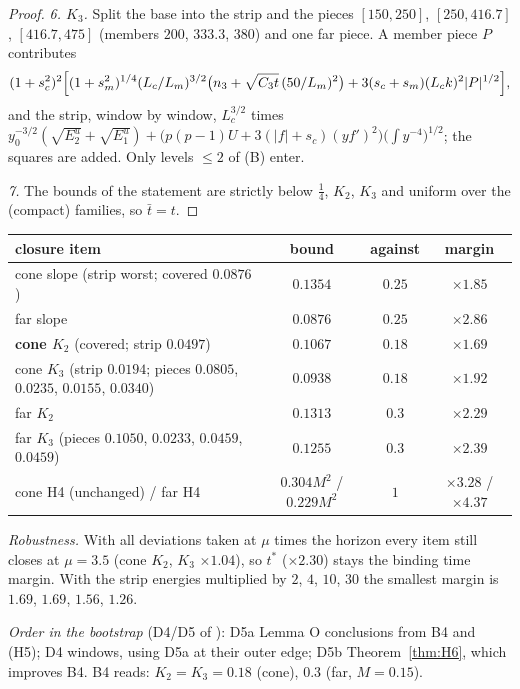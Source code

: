 \documentclass[11pt]{article}
\newcommand{\fn}[1]{\texttt{\detokenize{#1}}}
\begin{document}
\begin{proof}
\emph{6. $K_3$.} Split the base into the strip and the pieces $[150,250]$, $[250,416.7]$, $[416.7,475]$ (members $200$, $333.3$, $380$) and one far piece. A member piece $P$ contributes
\[(1+s_c^2)^2\Bigl[(1+s_m^2)^{1/4}(L_c/L_m)^{3/2}\bigl(n_3+\sqrt{C_3t}\,(50/L_m)^2\bigr)+3(s_c+s_m)(L_ck)^2|P|^{1/2}\Bigr],\]
and the strip, window by window, $L_c^{3/2}$ times $y_0^{-3/2}(\sqrt{E^u_2}+\sqrt{E^u_1})+\bigl(p(p-1)U+3(|f|+s_c)(yf')^2\bigr)\bigl(\int y^{-4}\bigr)^{1/2}$; the squares are added. Only levels $\le2$ of (B) enter.

\emph{7.} The bounds of the statement are strictly below $\tfrac14$, $K_2$, $K_3$ and uniform over the (compact) families, so $\bar t=t$.
\end{proof}
\begin{center}\small\begin{tabular}{lccc}\toprule
closure item & bound & against & margin\\\midrule
cone slope (strip worst; covered $0.0876$) & $0.1354$ & $0.25$ & $\times1.85$\\
far slope & $0.0876$ & $0.25$ & $\times2.86$\\
\textbf{cone $K_2$} (covered; strip $0.0497$) & $0.1067$ & $0.18$ & $\mathbf{\times1.69}$\\
cone $K_3$ (strip $0.0194$; pieces $0.0805$, $0.0235$, $0.0155$, $0.0340$) & $0.0938$ & $0.18$ & $\times1.92$\\
far $K_2$ & $0.1313$ & $0.3$ & $\times2.29$\\
far $K_3$ (pieces $0.1050$, $0.0233$, $0.0459$, $0.0459$) & $0.1255$ & $0.3$ & $\times2.39$\\
cone H4 (unchanged) / far H4 & $0.304M^2$ / $0.229M^2$ & $1$ & $\times3.28$ / $\times4.37$\\\bottomrule
\end{tabular}\end{center}
\emph{Robustness.} With all deviations taken at $\mu$ times the horizon every item still closes at $\mu=3.5$ (cone $K_2$, $K_3$ $\times1.04$), so $t^*$ ($\times2.30$) stays the binding time margin. With the strip energies multiplied by $2$, $4$, $10$, $30$ the smallest margin is $1.69$, $1.69$, $1.56$, $1.26$.

\noindent\emph{Order in the bootstrap} (D4/D5 of \fn{step3_proof_v32.tex}): D5a Lemma O conclusions from B4 and (H5); D4 windows, using D5a at their outer edge; D5b Theorem~\ref{thm:H6}, which improves B4. B4 reads: $K_2=K_3=0.18$ (cone), $0.3$ (far, $M=0.15$).
\end{document}
